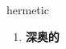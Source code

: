 
\begin{frame}
{\huge hermetic}
\begin{center}
\begin{enumerate}\Large
  \item \textbf{深奥的}
\end{enumerate}
\end{center}
\end{frame}
